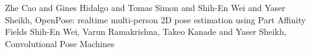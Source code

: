 \documentclass[letterpaper, 10 pt, conference]{ieeeconf}  %
\begin{document}







\begin{thebibliography}{99}
 Zhe Cao and Gines Hidalgo and Tomas Simon and Shih-En Wei and Yaser Sheikh, Open{P}ose: realtime multi-person 2{D} pose estimation using {P}art {A}ffinity {F}ields
 Shih-En Wei, Varun Ramakrishna, Takeo Kanade and Yaser Sheikh, Convolutional Pose Machines




\end{thebibliography}
\end{document}
